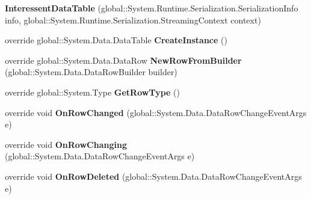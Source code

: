\begin{DoxyCompactItemize}
\item 
{\bfseries Interessent\+Data\+Table} (global\+::\+System.\+Runtime.\+Serialization.\+Serialization\+Info info, global\+::\+System.\+Runtime.\+Serialization.\+Streaming\+Context context)\hypertarget{class_products_1_1_data_1_1ds_sage_1_1_interessent_data_table_a41f9fb1ec37aeb764b9b5596a2190b91}{}\label{class_products_1_1_data_1_1ds_sage_1_1_interessent_data_table_a41f9fb1ec37aeb764b9b5596a2190b91}

\item 
override global\+::\+System.\+Data.\+Data\+Table {\bfseries Create\+Instance} ()\hypertarget{class_products_1_1_data_1_1ds_sage_1_1_interessent_data_table_ada1a2d26dd18f5e46c653fffd349cdd8}{}\label{class_products_1_1_data_1_1ds_sage_1_1_interessent_data_table_ada1a2d26dd18f5e46c653fffd349cdd8}

\item 
override global\+::\+System.\+Data.\+Data\+Row {\bfseries New\+Row\+From\+Builder} (global\+::\+System.\+Data.\+Data\+Row\+Builder builder)\hypertarget{class_products_1_1_data_1_1ds_sage_1_1_interessent_data_table_a09ee441da4e344c57bfce6d1f545f627}{}\label{class_products_1_1_data_1_1ds_sage_1_1_interessent_data_table_a09ee441da4e344c57bfce6d1f545f627}

\item 
override global\+::\+System.\+Type {\bfseries Get\+Row\+Type} ()\hypertarget{class_products_1_1_data_1_1ds_sage_1_1_interessent_data_table_aa5dba5a402b85792cd3b67d9f86ebdb3}{}\label{class_products_1_1_data_1_1ds_sage_1_1_interessent_data_table_aa5dba5a402b85792cd3b67d9f86ebdb3}

\item 
override void {\bfseries On\+Row\+Changed} (global\+::\+System.\+Data.\+Data\+Row\+Change\+Event\+Args e)\hypertarget{class_products_1_1_data_1_1ds_sage_1_1_interessent_data_table_a088eaae33980d46440fa66ac72bf1b2e}{}\label{class_products_1_1_data_1_1ds_sage_1_1_interessent_data_table_a088eaae33980d46440fa66ac72bf1b2e}

\item 
override void {\bfseries On\+Row\+Changing} (global\+::\+System.\+Data.\+Data\+Row\+Change\+Event\+Args e)\hypertarget{class_products_1_1_data_1_1ds_sage_1_1_interessent_data_table_a07362858f249445f06f15a10834fdf84}{}\label{class_products_1_1_data_1_1ds_sage_1_1_interessent_data_table_a07362858f249445f06f15a10834fdf84}

\item 
override void {\bfseries On\+Row\+Deleted} (global\+::\+System.\+Data.\+Data\+Row\+Change\+Event\+Args e)\hypertarget{class_products_1_1_data_1_1ds_sage_1_1_interessent_data_table_aa3d1e1dcae8158e7e10e470e70b77698}{}\label{class_products_1_1_data_1_1ds_sage_1_1_interessent_data_table_aa3d1e1dcae8158e7e10e470e70b77698}


\end{DoxyCompactItemize}
